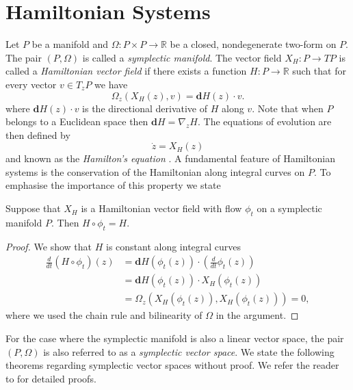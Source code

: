 \section{Hamiltonian Systems} \label{chap:Hasy:1}
Let $P$ be a manifold and $\Omega:P\times P \to \mathbb R$ be a closed, nondegenerate two-form on $P$. The pair $(P,\Omega)$ is called a \emph{symplectic manifold}. The vector field $X_H:P \to TP$ is called a \emph{Hamiltonian vector field} if there exists a function $H:P\to \mathbb R$ such that for every vector $v\in T_zP$ we have
\begin{equation} \label{eq:Hasy:1}
	\Omega_z(X_H(z),v) = \mathbf d H(z) \cdot v.
\end{equation}
where $\mathbf d H(z) \cdot v$ is the directional derivative of $H$ along $v$. Note that when $P$ belongs to a Euclidean space then $\mathbf d H = \nabla_z H$. The equations of evolution are then defined by
\begin{equation} \label{eq:Hasy:2}
	\dot z = X_H(z)
\end{equation}
and known as the \emph{Hamilton's equation} \cite{Marsden:1999ck}. A fundamental feature of Hamiltonian systems is the conservation of the Hamiltonian along integral curves on $P$. To emphasise the importance of this property we state

\begin{theorem} \label{theorem:Hasy:1}
Suppose that $X_H$ is a Hamiltonian vector field with flow $\phi_t$ on a symplectic manifold $P$. Then $H\circ \phi_t = H$.
\end{theorem}

\begin{proof}
We show that $H$ is constant along integral curves
\begin{equation} \label{eq:Hasy:3}
\begin{aligned}
	\frac{d}{dt}(H\circ \phi_t)(z) &= \mathbf d H(\phi_t(z)) \cdot( \frac{d}{dt} \phi_t(z) ) \\
	&= \mathbf d H (\phi_t(z))\cdot X_H(\phi_t(z)) \\
	&= \Omega_z( X_H(\phi_t(z)), X_H(\phi_t(z)) ) = 0,
\end{aligned}
\end{equation}
where we used the chain rule and bilinearity of $\Omega$ in the argument.
\end{proof}

For the case where the symplectic manifold is also a linear vector space, the pair $(P,\Omega)$ is also referred to as a \emph{symplectic vector space}. We state the following theorems regarding symplectic vector spaces without proof. We refer the reader to \cite{Marsden:1999ck,de2006symplectic,Silva01lectureson} for detailed proofs.

